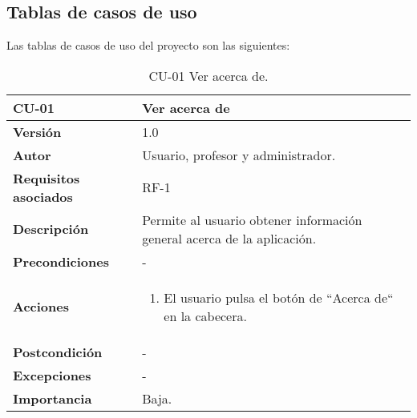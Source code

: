 \subsection{Tablas de casos de uso}
Las tablas de casos de uso del proyecto son las siguientes:
\begin{table}[h!]
	\centering
	\begin{tabularx}{\linewidth}{ p{} p{} }
		\toprule
		\textbf{CU-01}    & \textbf{Ver acerca de}\\
		\toprule
		\textbf{Versión}              & 1.0    \\
		\textbf{Autor}                & Usuario, profesor y administrador. \\
		\textbf{Requisitos asociados} & RF-1\\
		\textbf{Descripción}          & Permite al usuario obtener información general acerca de la aplicación. \\
		\textbf{Precondiciones}         & - \\
		\textbf{Acciones}             &
		\begin{enumerate}
			\def\labelenumi{\arabic{enumi}.}
			\tightlist
			\item El usuario pulsa el botón de ``Acerca de`` en la cabecera.
		\end{enumerate}\\
         \textbf{Postcondición}             & - \\
		\textbf{Excepciones}             & - \\
		\textbf{Importancia}          & Baja. \\
		\bottomrule
	\end{tabularx}
	\caption{CU-01 Ver acerca de.}
\end{table}

